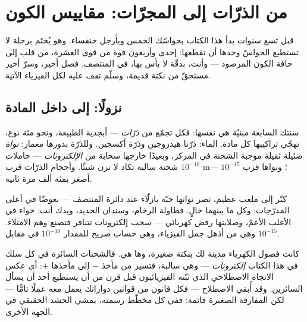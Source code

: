 \chapter{من الذرّات إلى المجرّات: مقاييس الكون}\label{ch:g9:atoms-to-galaxies}

قبل تسع سنوات بدأ هذا الكتاب بحواسّك الخمس وبأرجل خنفساء. وهو
يُختَم برحلة لا تستطيع الحواسّ وحدها أن تقطعها: إحدى وأربعون
قوة من قوى العشرة، من قلب  إلى حافة الكون المرصود ---
وأنت، بدقّة لا بأس بها، في المنتصف. فصل أخير، وسرّ أخير مستحقّ
من نكتة قديمة، وسلّم تقف عليه لكل الفيزياء الآتية.

\section{نزولًا: إلى داخل المادة}

\begin{definition}[الذرّات]\label{def:g9:atoms-to-galaxies:atom}
 سنتك السابعة مبنيّة هي نفسها: فكل  تجمّع من
\emph{ذرّات} --- أبجدية الطبيعة، ونحو مئة نوع،
تهجّي تراكيبها كل مادة.  الماء: ذرّتا هيدروجين وذرّة
أكسجين. وللذرّة بدورها معمار: \emph{نواة} ضئيلة
ثقيلة موجبة الشحنة في المركز، وبعيدًا خارجها سحابة من
\emph{الإلكترونات} --- حاملات شحنة سالبة تكاد
لا تزن شيئًا. وأحجام الذرّات قرب $10^{-10}$ \unit{m}؛ ونواها
قرب $10^{-15}$ --- أصغر بمئة ألف مرة ثانية.
\end{definition}

\begin{proposition}\label{prop:g9:atoms-to-galaxies:empty}
كبّر  إلى ملعب عظيم، تصر نواتها حبّة بازلّاء عند دائرة
المنتصف ---  بعوضًا في أعلى المدرّجات: وكل ما
بينهما خالٍ. فطاولة الرخام، وسندان الحديد، ويدك أنت:
خواء في الأغلب الأعمّ، وصلابتها رفض كهربائي --- سحب إلكترونات
 تتنافر فتصنع وهم الامتلاء. وهي من أذهل جمل الفيزياء،
وهي حساب صريح للمقدار $10^{-10}$ في مقابل $10^{-15}$.
\end{proposition}

\begin{example}\label{ex:g9:atoms-to-galaxies:electron}
كانت فصول الكهرباء مدينة لك بنكتة صغيرة، وها هي. فالشحنات
السائرة في كل سلك في هذا الكتاب \emph{إلكترونات} --- وهي
سالبة، فتسير من مأخذ  $-$ إلى مأخذها $+$: أي عكس
الاتجاه الاصطلاحي الذي ثبّته الفيزيائيون قبل قرن من أن يستطيع
أحد أن يسأل السائرين. وقد أُبقي الاصطلاح --- فكل قانون من
قوانين دواراتك يعمل معه عملًا تامًّا --- لكن المفارقة الصغيرة
قائمة: ففي كل مخطّط رسمته، يمشي الحشد الحقيقي في الجهة
الأخرى.
\end{example}

